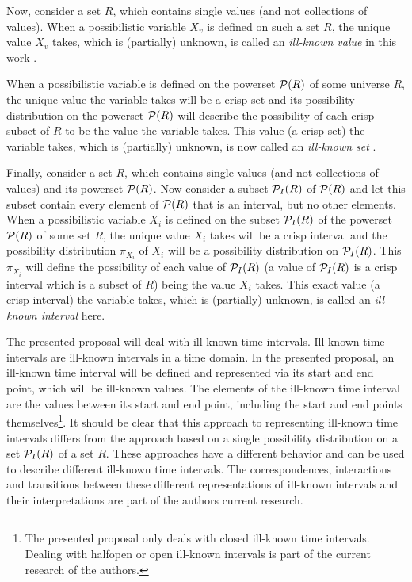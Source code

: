 Now, consider a set $R$, which contains single values (and not collections of values). When a possibilistic variable $X_{v}$ is defined on such a set $R$, the unique value $X_{v}$ takes, which is (partially) unknown, is called an \emph{ill-known value} in this work \cite{Dubois88b}.

When a possibilistic variable is defined on the powerset $\mathcal{P}(R)$ of some universe $R$, the unique value the variable takes will be a crisp set and its possibility distribution on the powerset $\mathcal{P}(R)$ will describe the possibility of each crisp subset of $R$ to be the value the variable takes. This value (a crisp set) the variable takes, which is (partially) unknown, is now called an \emph{ill-known set} \cite{Dubois88b}.

Finally, consider a set $R$, which contains single values (and not collections of values) and its powerset $\mathcal{P}(R)$. Now consider a subset $\mathcal{P}_{I}(R)$ of $\mathcal{P}(R)$ and let this subset contain every element of $\mathcal{P}(R)$ that is an interval, but no other elements. When a possibilistic variable $X_{i}$ is defined on the subset $\mathcal{P}_{I}(R)$ of the powerset $\mathcal{P}(R)$ of some set $R$, the unique value $X_{i}$ takes will be a crisp interval and the possibility distribution $\pi_{X_{i}}$ of $X_{i}$ will be a possibility distribution on $\mathcal{P}_{I}(R)$. This $\pi_{X_{i}}$ will define the possibility of each value of $\mathcal{P}_{I}(R)$ (a value of $\mathcal{P}_{I}(R)$ is a crisp interval which is a subset of $R$) being the value $X_{i}$ takes. This exact value (a crisp interval) the variable takes, which is (partially) unknown, is called an \emph{ill-known interval} here.

The presented proposal will deal with ill-known time intervals. Ill-known time intervals are ill-known intervals in a time domain. In the presented proposal, an ill-known time interval will be defined and represented via its start and end point, which will be ill-known values. The elements of the ill-known time interval are the values between its start and end point, including the start and end points themselves\footnote{The presented proposal only deals with closed ill-known time intervals. Dealing with halfopen or open ill-known intervals is part of the current research of the authors.}. It should be clear that this approach to representing ill-known time intervals differs from the approach based on a single possibility distribution on a set $\mathcal{P}_{I}(R)$ of a set $R$. These approaches have a different behavior and can be used to describe different ill-known time intervals. The correspondences, interactions and transitions between these different representations of ill-known intervals and their interpretations are part of the authors current research.

